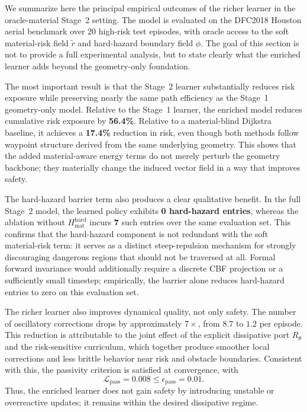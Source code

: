 We summarize here the principal empirical outcomes of the richer learner in
the oracle-material Stage~2 setting. The model is evaluated on the DFC2018
Houston aerial benchmark over 20 high-risk test episodes, with oracle access
to the soft material-risk field $\tilde r$ and hard-hazard boundary field
$\phi$. The goal of this section is not to provide a full experimental
analysis, but to state clearly what the enriched learner adds beyond the
geometry-only foundation.

The most important result is that the Stage~2 learner substantially reduces
risk exposure while preserving nearly the same path efficiency as the
Stage~1 geometry-only model. Relative to the Stage~1 learner, the enriched
model reduces cumulative risk exposure by \textbf{56.4\%}. Relative to a
material-blind Dijkstra baseline, it achieves a \textbf{17.4\%} reduction in
risk, even though both methods follow waypoint structure derived from the same
underlying geometry. This shows that the added material-aware energy terms do
not merely perturb the geometry backbone; they materially change the induced
vector field in a way that improves safety.

The hard-hazard barrier term also produces a clear qualitative benefit. In the
full Stage~2 model, the learned policy exhibits \textbf{0 hard-hazard entries},
whereas the ablation without $H_{\mathrm{mat}}^{\mathrm{hard}}$ incurs
\textbf{7} such entries over the same evaluation set. This confirms that the
hard-hazard component is not redundant with the soft material-risk term:
it serves as a distinct steep-repulsion mechanism for strongly discouraging
dangerous regions that should not be traversed at all.
Formal forward invariance would additionally require a discrete CBF
projection or a sufficiently small timestep; empirically, the barrier alone
reduces hard-hazard entries to zero on this evaluation set.

The richer learner also improves dynamical quality, not only safety. The number
of oscillatory corrections drops by approximately \textbf{$7\times$}, from
$8.7$ to $1.2$ per episode. This reduction is attributable to the joint effect
of the explicit dissipative port $R_\theta$ and the risk-sensitive curriculum,
which together produce smoother local corrections and less brittle behavior near
risk and obstacle boundaries. Consistent with this, the passivity criterion is
satisfied at convergence, with
\[
\mathcal L_{\mathrm{pass}} = 0.008 \le \epsilon_{\mathrm{pass}} = 0.01.
\]
Thus, the enriched learner does not gain safety by introducing unstable or
overreactive updates; it remains within the desired dissipative regime.


